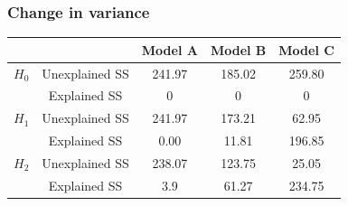 \documentclass[aspectratio=43]{beamer}
\begin{document}
\begin{frame}[T]
\frametitle{Change in variance}

\begin{table}[htdp]
	\begin{center}
		\begin{tabular}{ccccc}
				&  & Model A & Model B & Model C \\
		\hline
		$H_0 $ & Unexplained SS & 241.97 & 185.02 & 259.80 \\
		       & Explained SS   & 0      & 0      &    0   \\
		$H_1 $ & Unexplained SS & 241.97 & 173.21 & 62.95 \\
		       & Explained SS   & 0.00  & 11.81 & 196.85 \\
		$H_2 $ & Unexplained SS & 238.07 & 123.75 & 25.05 \\
		       & Explained SS   & 3.9  & 61.27 & 234.75 \\
		\end{tabular}
	\end{center}
\end{table}

\end{frame}


% 
% 
% 
\end{document}
